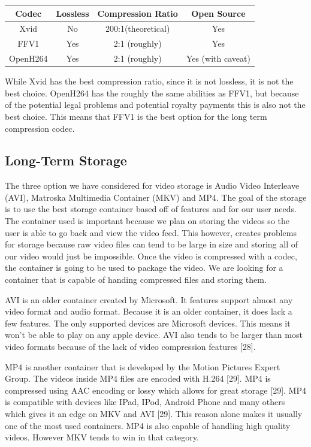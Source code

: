 \documentclass[onecolumn, draftclsnofoot,10pt, compsoc]{IEEEtran}
\begin{document}
\begin{center}
	\begin{tabular}{|c|c|c|c|}
		\hline
		\textbf{Codec} & \textbf{Lossless} & \textbf{Compression Ratio} & \textbf{Open Source} \\
		\hline
		Xvid & No & 200:1(theoretical) & Yes \\
		\hline
		FFV1 & Yes & 2:1 (roughly) & Yes \\
		\hline
		OpenH264 & Yes & 2:1 (roughly) & Yes (with caveat) \\
		\hline
		
	\end{tabular}
\end{center}

While Xvid has the best compression ratio, since it is not lossless, it is not the best choice.
OpenH264 has the roughly the same abilities as FFV1, but because of the potential legal problems and potential royalty payments this is also not the best choice.
This means that FFV1 is the best option for the long term compression codec.

\newpage
\subsection{Long-Term Storage} %

The three option we have considered for video storage is Audio Video Interleave (AVI), Matroska Multimedia Container (MKV) and MP4.
The goal of the storage is to use the best storage container based off of features and for our user needs.
The container used is important because we plan on storing the videos so the user is able to go back and view the video feed.
This however, creates problems for storage because raw video files can tend to be large in size and storing all of our video would just be impossible.
Once the video is compressed with a codec, the container is going to be used to package the video.
We are looking for a container that is capable of handing compressed files and storing them.

AVI is an older container created by Microsoft. It features support almost any video format and audio format.
Because it is an older container, it does lack a few features.
The only supported devices are Microsoft devices.
This means it won't be able to play on any apple device.
AVI also tends to be larger than most video formats because of the lack of video compression features [28].

MP4 is another container that is developed by the Motion Pictures Expert Group.
The videos inside MP4 files are encoded with H.264 [29].
MP4 is compressed using AAC encoding or lossy which allows for great storage [29].
MP4 is compatible with devices like IPad, IPod, Android Phone and many others which gives it an edge on MKV and AVI [29].
This reason alone makes it usually one of the most used containers.
MP4 is also capable of handling high quality videos.
However MKV tends to win in that category.
\end{document}
